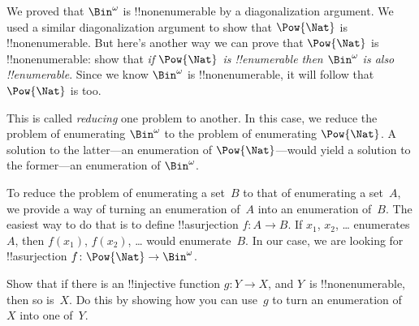 \documentclass[../../../include/open-logic-section]{subfiles}
\begin{document}


We proved that $\Bin^\omega$ is !!{nonenumerable} by a diagonalization argument. We used a similar diagonalization argument to show that $\Pow{\Nat}$ is !!{nonenumerable}. But here's
another way we can prove that $\Pow{\Nat}$ is !!{nonenumerable}: show that \emph{if $\Pow{\Nat}$ is !!{enumerable} then $\Bin^\omega$ is also !!{enumerable}}.  Since we know $\Bin^\omega$ is
!!{nonenumerable}, it will follow that $\Pow{\Nat}$ is too.  

This is called
\emph{reducing} one problem to another. In this case, we reduce the
problem of enumerating $\Bin^\omega$ to the problem of enumerating
$\Pow{\Nat}$.  A solution to the latter---an enumeration of
$\Pow{\Nat}$---would yield a solution to the former---an enumeration
of $\Bin^\omega$.

To reduce the problem of enumerating a set~$B$ to that of
enumerating a set~$A$, we provide a way of turning an enumeration
of~$A$ into an enumeration of~$B$.  The easiest way to do that is to
define !!a{surjection} $f\colon A \to B$.  If $x_1$, $x_2$,
\dots{} enumerates~$A$, then $f(x_1)$, $f(x_2)$, \dots{} would
enumerate~$B$.  In our case, we are looking for !!a{surjection} $f\colon \Pow{\Nat} \to \Bin^\omega$.

\begin{prob}
Show that if there is an !!{injective} function $g\colon Y \to X$, and
$Y$~is !!{nonenumerable}, then so is~$X$. Do this by showing how you
can use~$g$ to turn an enumeration of~$X$ into one of~$Y$.
\end{prob}
\end{document}
